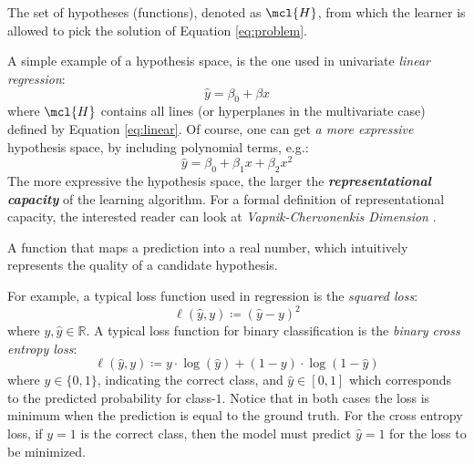 \begin{definition}
	The set of hypotheses (functions), denoted as $\mcl{H}$, from which the
	learner is allowed to pick the solution of Equation \ref{eq:problem}.
\end{definition}

A simple example of a hypothesis space, is the one used in univariate
\emph{linear regression}:
\begin{equation}
	\label{eq:linear}
	\hat{y} = \beta_0 + \beta x
\end{equation}
where $\mcl{H}$ contains all lines (or hyperplanes in the multivariate case)
defined by Equation \ref{eq:linear}. Of course, one can get \emph{a
more expressive} hypothesis space, by including polynomial terms, e.g.:
\begin{equation}
	\label{eq:polynomial}
	\hat{y} = \beta_0 + \beta_1 x + \beta_2 x^2
\end{equation}
The more expressive the hypothesis space, the larger the
\emph{\textbf{representational capacity}} of
the learning algorithm. For a formal definition of representational capacity,
the interested reader can look at \emph{Vapnik-Chervonenkis
Dimension} \parencite{statlearn}.

\begin{definition}
	A function that maps a prediction into a real number, which intuitively
	represents the quality of a candidate hypothesis.
\end{definition}

For example, a typical loss function used in regression is the \emph{squared
loss}:
\begin{equation}
	\label{eq:squared_loss}
	\ell(\hat{y}, y) \coloneqq (\hat{y} - y)^2
\end{equation}
where $y, \hat{y} \in \mathbb{R}$. A typical loss function for binary
classification is the \emph{binary cross entropy
loss}:
\begin{equation}
	\label{eq:cross_entropy}
	\ell(\hat{y}, y) \coloneqq y \cdot \log (\hat{y})
	+ (1 - y) \cdot \log (1 - \hat{y})
\end{equation}
where $y \in \{0, 1\}$, indicating the correct class, and $\hat{y} \in [0, 1]$
which corresponds to the predicted probability for class-$1$. Notice that in
both cases the loss is minimum when the prediction is equal to the ground truth.
For the cross entropy loss, if $y=1$ is the correct class, then the model must
predict $\hat{y}=1$ for the loss to be minimized.

